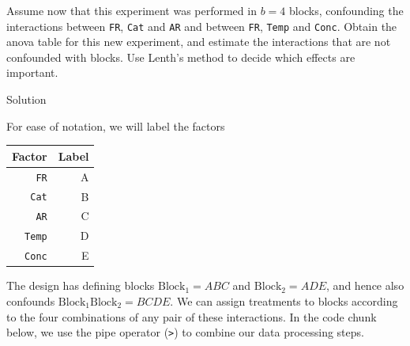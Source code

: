 \documentclass[
]{book}
\theoremstyle{definition}
\theoremstyle{definition}
\theoremstyle{definition}
\theoremstyle{definition}
\theoremstyle{remark}
\begin{document}
\begin{enumerate}
  Assume now that this experiment was performed in \(b=4\) blocks, confounding the interactions between \texttt{FR}, \texttt{Cat} and \texttt{AR} and between \texttt{FR}, \texttt{Temp} and \texttt{Conc}. Obtain the anova table for this new experiment, and estimate the interactions that are not confounded with blocks. Use Lenth's method to decide which effects are important.
\end{enumerate}

Solution

For ease of notation, we will label the factors

\begin{longtable}[]{@{}rr@{}}
\toprule()
Factor & Label \\
\midrule()
\endhead
\texttt{FR} & A \\
\texttt{Cat} & B \\
\texttt{AR} & C \\
\texttt{Temp} & D \\
\texttt{Conc} & E \\
\bottomrule()
\end{longtable}

The design has defining blocks \(\mathrm{Block}_1 = ABC\) and \(\mathrm{Block}_2 = ADE\), and hence also confounds \(\mathrm{Block}_1\mathrm{Block}_2 = BCDE\). We can assign treatments to blocks according to the four combinations of any pair of these interactions. In the code chunk below, we use the pipe operator (\texttt{\textbar{}\textgreater{}}) to combine our data processing steps.
\end{document}
